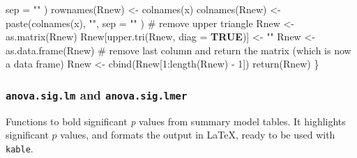 \documentclass[
  bookmarksnumbered]{article}
\newenvironment{Shaded}{\begin{snugshade}}{\end{snugshade}}
\newcommand{\AttributeTok}[1]{\textcolor[rgb]{0.80,0.80,0.80}{#1}}
\newcommand{\CommentTok}[1]{\textcolor[rgb]{0.50,0.62,0.50}{#1}}
\newcommand{\ConstantTok}[1]{\textcolor[rgb]{0.86,0.64,0.64}{\textbf{#1}}}
\newcommand{\DecValTok}[1]{\textcolor[rgb]{0.86,0.86,0.80}{#1}}
\newcommand{\FunctionTok}[1]{\textcolor[rgb]{0.94,0.94,0.56}{#1}}
\newcommand{\NormalTok}[1]{\textcolor[rgb]{0.80,0.80,0.80}{#1}}
\newcommand{\OtherTok}[1]{\textcolor[rgb]{0.94,0.94,0.56}{#1}}
\newcommand{\SpecialCharTok}[1]{\textcolor[rgb]{0.86,0.64,0.64}{#1}}
\newcommand{\StringTok}[1]{\textcolor[rgb]{0.80,0.58,0.58}{#1}}
\begin{document}
\begin{Shaded}
\begin{Highlighting}[]
    \AttributeTok{sep =} \StringTok{""}
\NormalTok{  )}
  \FunctionTok{rownames}\NormalTok{(Rnew) }\OtherTok{\textless{}{-}} \FunctionTok{colnames}\NormalTok{(x)}
  \FunctionTok{colnames}\NormalTok{(Rnew) }\OtherTok{\textless{}{-}} \FunctionTok{paste}\NormalTok{(}\FunctionTok{colnames}\NormalTok{(x), }\StringTok{""}\NormalTok{,}
    \AttributeTok{sep =} \StringTok{""}
\NormalTok{  )}
  \CommentTok{\# remove upper triangle}
\NormalTok{  Rnew }\OtherTok{\textless{}{-}} \FunctionTok{as.matrix}\NormalTok{(Rnew)}
\NormalTok{  Rnew[}\FunctionTok{upper.tri}\NormalTok{(Rnew, }\AttributeTok{diag =} \ConstantTok{TRUE}\NormalTok{)] }\OtherTok{\textless{}{-}} \StringTok{""}
\NormalTok{  Rnew }\OtherTok{\textless{}{-}} \FunctionTok{as.data.frame}\NormalTok{(Rnew)}
  \CommentTok{\# remove last column and return the matrix (which is now a data frame)}
\NormalTok{  Rnew }\OtherTok{\textless{}{-}} \FunctionTok{cbind}\NormalTok{(Rnew[}\DecValTok{1}\SpecialCharTok{:}\FunctionTok{length}\NormalTok{(Rnew) }\SpecialCharTok{{-}} \DecValTok{1}\NormalTok{])}
  \FunctionTok{return}\NormalTok{(Rnew)}
\NormalTok{\}}
\end{Highlighting}
\end{Shaded}

\subsubsection{\texorpdfstring{\texttt{anova.sig.lm} and \texttt{anova.sig.lmer}}{anova.sig.lm and anova.sig.lmer}}\label{anova.sig.lm-and-anova.sig.lmer}

Functions to bold significant \emph{p} values from summary model tables. It highlights significant \(p\) values, and formats the output in \LaTeX, ready to be used with \texttt{kable}.
\end{document}
